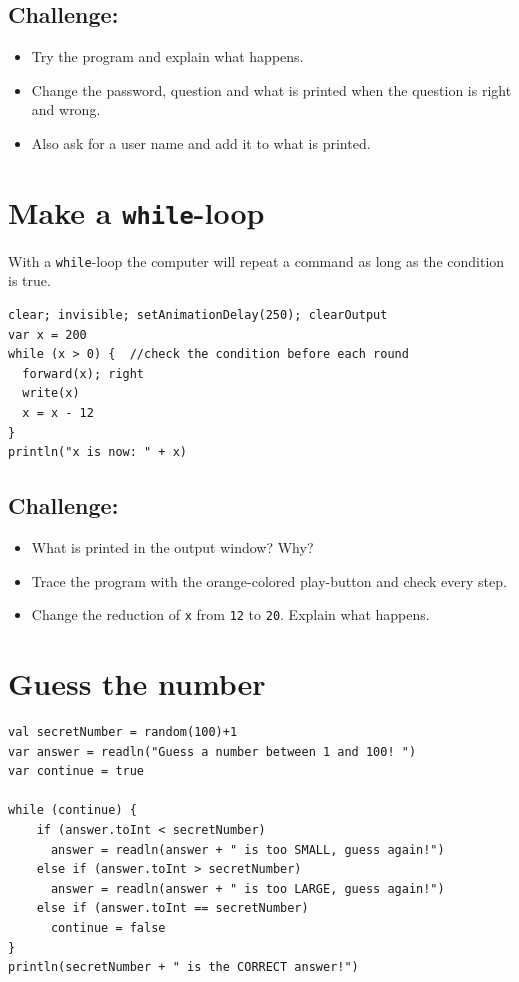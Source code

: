 \section*{\color{BrickRed}Challenge:}


\begin{itemize}

\item {Try the program and explain what happens.}
\item {Change the password, question and what is printed when the question is right and wrong.}
\item {Also ask for a user name and add it to what is printed.}

\end{itemize}


\chapter{Make a \lstinline{while}-loop}With a \lstinline{while}-loop the computer will repeat a command as long as the condition is true.

\begin{lstlisting}[basicstyle={\ttfamily\fontsize{22}{27}\selectfont},numbers=none]
clear; invisible; setAnimationDelay(250); clearOutput
var x = 200
while (x > 0) {  //check the condition before each round 
  forward(x); right
  write(x) 
  x = x - 12
}
println("x is now: " + x)
\end{lstlisting}
        
\section*{\color{BrickRed}Challenge:}


\begin{itemize}

\item {What is printed in the output window? Why?}
\item {Trace the program with the orange-colored play-button and check every step.}
\item {Change the reduction of \lstinline{x} from \lstinline{12} to \lstinline{20}. Explain what happens.}

\end{itemize}


\chapter{Guess the number}
\begin{lstlisting}[basicstyle={\ttfamily\fontsize{16}{19}\selectfont},numbers=none]
val secretNumber = random(100)+1
var answer = readln("Guess a number between 1 and 100! ")
var continue = true

while (continue) {
    if (answer.toInt < secretNumber)
      answer = readln(answer + " is too SMALL, guess again!")
    else if (answer.toInt > secretNumber)
      answer = readln(answer + " is too LARGE, guess again!")
    else if (answer.toInt == secretNumber)
      continue = false
}
println(secretNumber + " is the CORRECT answer!")
\end{lstlisting}
        
